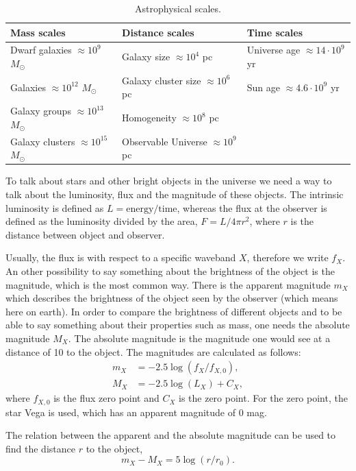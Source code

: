 \begin{table}
\label{table:scales}
\centering
\begin{tabular}{lll}
\toprule
Mass scales & Distance scales & Time scales\\
\midrule
Dwarf galaxies $\approx 10^9$ $M_\odot$ & Galaxy size $\approx 10^4$ pc &  Universe age $\approx 14\cdot 10^9$ yr\\
Galaxies $\approx 10^{12}$ $M_\odot$ & Galaxy cluster size $\approx 10^6$ pc & Sun age $\approx 4.6\cdot 10^9$ yr\\
Galaxy groups $\approx 10^{13}$ $M_\odot$ & Homogeneity $\approx 10^8$ pc & \\
Galaxy clusters $\approx 10^{15}$ $M_\odot$ & Observable Universe $\approx 10^9$ pc & \\
\bottomrule
\end{tabular}
\caption{Astrophysical scales.}
\label{tab:units}
\end{table}

To talk about stars and other bright objects in the universe we need a way to talk about the luminosity, flux and the magnitude of these objects. The intrinsic luminosity is defined as $L = \text{energy}/\text{time}$, whereas the flux at the observer is defined as the luminosity divided by the area, $F = L/4\pi r^2$, where $r$ is the distance between object and observer.

Usually, the flux is with respect to a specific waveband $X$, therefore we write $f_X$. An other possibility to say something about the brightness of the object is the magnitude, which is the most common way. There is the apparent magnitude $m_X$ which describes the brightness of the object seen by the observer (which means here on earth). In order to compare the brightness of different objects and to be able to say something about their properties such as mass, one needs the absolute magnitude $M_X$. The absolute magnitude is the magnitude one would see at a distance of \SI{10}{\parsec} to the object. The magnitudes are calculated as follows:
\begin{align*}
	m_X &= -2.5 \log(f_X/f_{X,0}),\\
	M_X &= -2.5 \log(L_X) + C_X,
\end{align*}
where $f_{X,0}$ is the flux zero point and $C_X$ is the zero point. For the zero point, the star Vega is used, which has an apparent magnitude of $0$ mag.

The relation between the apparent and the absolute magnitude can be used to find the distance $r$ to the object,
\begin{equation}
	m_X - M_X = 5\log(r/r_0).
\end{equation}
